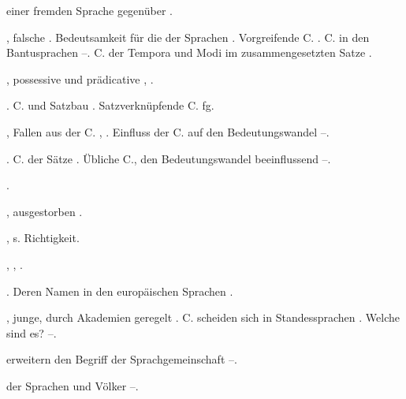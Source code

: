 \begin{register}

 einer fremden Sprache gegenüber \pageref{sp.84}.

, falsche \pageref{sp.214}. Bedeutsamkeit für die  der Sprachen \pageref{sp.390}. Vorgreifende C. \pageref{sp.402}. C. in den Bantusprachen \pageref{sp.420}–\pageref{sp.421}. C. der Tempora und Modi im zusammengesetzten Satze \pageref{sp.465}.

, possessive und prädicative \pageref{sp.391}, \pageref{sp.460}. 

 \pageref{sp.104}. C. und Satzbau \pageref{sp.418}. Satzverknüpfende C. \pageref{sp.465} f\pageref{sp.1}g. 

, Fallen aus der C. \pageref{sp.43}, \pageref{sp.182}. Einfluss der C. auf den Bedeutungswandel \pageref{sp.234}–\pageref{sp.236}.

 \pageref{sp.101}. C. der Sätze \pageref{sp.104}. Übliche C., den Bedeutungswandel beeinflussend \pageref{sp.234}–\pageref{sp.236}.

 \pageref{sp.102}.



, ausgestorben \pageref{sp.146}.


, s. Richtigkeit.

 \pageref{sp.158}, \pageref{sp.182}, \pageref{sp.279}.


. Deren Namen in den europäischen Sprachen \pageref{sp.297}.

, junge, durch Akademien geregelt \pageref{sp.126}. C. scheiden sich in Standessprachen \pageref{sp.288}. Welche sind es? \pageref{sp.388}–\pageref{sp.389}.

 erweitern den Begriff der Sprachgemeinschaft \pageref{sp.57}–\pageref{sp.58}.

 der Sprachen und Völker \pageref{sp.388}–\pageref{sp.389}.


\end{register}
